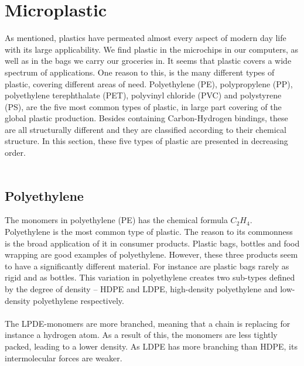 \section{Microplastic} \label{sec:microplastic}
\noindent
As mentioned, plastics have permeated almost every aspect of modern day life with its large applicability. We find plastic in the microchips in our computers, as well as in the bags we carry our groceries in. It seems that plastic covers a wide spectrum of applications.  One reason to this, is the many different types of plastic, covering different areas of need. Polyethylene (PE), polypropylene (PP), polyethylene terephthalate (PET), polyvinyl chloride (PVC) and polystyrene (PS), are the five most common types of plastic, in large part covering of the global plastic production. Besides containing Carbon-Hydrogen bindings, these are all structurally different and they are classified according to their chemical structure. In this section, these five types of plastic are presented in decreasing order. 
\\\\

\subsection{Polyethylene}
The monomers in polyethylene (PE) has the chemical formula $C_2H_4$. Polyethylene is the most common type of plastic. The reason to its commonness is the broad application of it in consumer products. Plastic bags, bottles and food wrapping are good examples of polyethylene. However, these three products seem to have a significantly different material. For instance are plastic bags rarely as rigid and as bottles. This variation in polyethylene creates two sub-types defined by the degree of density – HDPE and LDPE, high-density polyethylene and low-density polyethylene respectively. 
\\\\
The LPDE-monomers are more branched, meaning that a chain is replacing for instance a hydrogen atom. As a result of this, the monomers are less tightly packed, leading to a lower density.  As LDPE has more branching than HDPE, its intermolecular forces are weaker.


